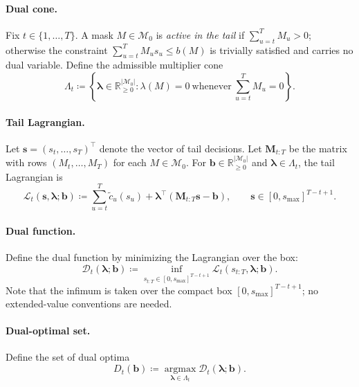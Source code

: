 \documentclass[11pt]{article}
\newcommand{\R}{\mathbb{R}}
\newcommand{\1}{\mathbf{1}}
\newcommand{\eqdef}{\coloneqq}
\newcommand{\mcal}{\mathcal{M}}
\newcommand{\argmax}{\operatorname*{argmax}}
\begin{document}

\paragraph{Dual cone.}
Fix $t \in \{1,\dots,T\}$.
A mask $M \in \mcal_{0}$ is \emph{active in the tail} if $\sum_{u=t}^{T} M_u > 0$;
otherwise the constraint $\sum_{u=t}^{T} M_u s_u \leq b(M)$ is trivially satisfied and carries no dual variable.
Define the admissible multiplier cone
\begin{equation*}
  \Lambda_t
  \eqdef
  \left\{\boldsymbol{\lambda} \in \R_{\geq 0}^{|\mcal_{0}|}
  : \lambda(M) = 0 \ \text{whenever}\ \sum_{u=t}^{T} M_u = 0\right\}.
\end{equation*}

\paragraph{Tail Lagrangian.}
Let $\mathbf{s} = (s_t, \dots, s_T)^\top$ denote the vector of tail decisions.
Let $\mathbf{M}_{t:T}$ be the matrix with rows $(M_t, \dots, M_T)$ for each $M \in \mcal_{0}$.
For $\mathbf{b} \in \R_{\geq 0}^{|\mcal_{0}|}$ and $\boldsymbol{\lambda} \in \Lambda_t$, the tail Lagrangian is
\begin{equation*}
  \mathcal{L}_t(\mathbf{s},\boldsymbol{\lambda};\mathbf{b})
  \eqdef
  \sum_{u=t}^{T} \tilde{c}_u(s_u)
  + \boldsymbol{\lambda}^\top (\mathbf{M}_{t:T} \mathbf{s} - \mathbf{b}),
  \qquad \mathbf{s} \in [0,s_{\max}]^{T-t+1}.
\end{equation*}

\paragraph{Dual function.}
Define the dual function by minimizing the Lagrangian over the box:
\begin{equation*}
  \mathcal{D}_t(\boldsymbol{\lambda};\mathbf{b})
  \eqdef
  \inf_{s_{t:T}\in[0,s_{\max}]^{T-t+1}}
  \mathcal{L}_t(s_{t:T},\boldsymbol{\lambda};\mathbf{b}).
\end{equation*}
Note that the infimum is taken over the compact box $[0,s_{\max}]^{T-t+1}$; no extended-value conventions are needed.

\paragraph{Dual-optimal set.}
Define the set of dual optima
\begin{equation*}
  D_t(\mathbf{b})
  \eqdef
  \argmax_{\boldsymbol{\lambda} \in \Lambda_t}
  \mathcal{D}_t(\boldsymbol{\lambda};\mathbf{b}).
\end{equation*}
\end{document}
